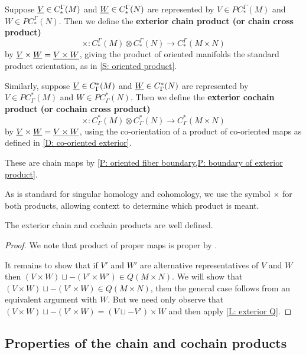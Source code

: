 \begin{definition}\label{D: exterior chain}
	Suppose $\underline{V} \in C_*^{\Gamma}(M)$ and $\underline{W} \in C_*^{\Gamma}(N)$ are represented by $V \in PC_*^{\Gamma}(M)$ and $W \in PC_*^{\Gamma}(N)$.
	Then we define the \textbf{exterior chain product (or chain cross product)} $$\times \colon C_*^{\Gamma}(M) \otimes C_*^{\Gamma}(N) \to C_*^{\Gamma}(M \times N)$$ by $\underline{V} \times \underline{W} = \underline{V \times W}$, giving the product of oriented manifolds the standard product orientation, as in \cref{S: oriented product}.

	Similarly, suppose $\underline{V} \in C^*_{\Gamma}(M)$ and $\underline{W} \in C^*_{\Gamma}(N)$ are represented by $V \in PC^*_{\Gamma}(M)$ and $W \in PC^*_{\Gamma}(N)$.
	Then we define the \textbf{exterior cochain product (or cochain cross product)}
	$$\times \colon C^*_{\Gamma}(M) \otimes C^*_{\Gamma}(N) \to C^*_{\Gamma}(M \times N)$$ by $\underline{V} \times \underline{W} = \underline{V \times W}$, using the co-orientation of a product of co-oriented maps as defined in \cref{D: co-oriented exterior}.

	These are chain maps by \cref{P: oriented fiber boundary,P: boundary of exterior product}.
\end{definition}

As is standard for singular homology and cohomology, we use the symbol $\times$ for both products, allowing context to determine which product is meant.

\begin{proposition}
	The exterior chain and cochain products are well defined.
\end{proposition}

\begin{proof}
	We note that product of proper maps is proper by \cite[Proposition I.10.1.4]{Bou98}.

	It remains to show that if $V'$ and $W'$ are alternative representatives of $V$ and $W$ then $(V \times W) \sqcup -(V' \times W') \in Q(M \times N)$.
	We will show that $(V \times W) \sqcup -(V' \times W) \in Q(M \times N)$, then the general case follows from an equivalent argument with $W$.
	But we need only observe that $(V \times W) \sqcup -(V' \times W) = (V \sqcup -V') \times W$ and then apply
	\cref{L: exterior Q}.
\end{proof}


\subsection{Properties of the chain and cochain products}\label{S: (co)chain properties}


